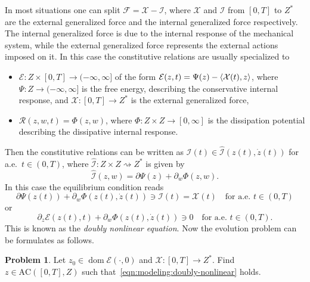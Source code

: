 \documentclass[a4paper,10pt,twoside]{amsbook}
\numberwithin{section}{chapter}
\numberwithin{equation}{chapter}
\theoremstyle{definition}
\newtheorem{prb}[prop]{Problem}
\DeclareMathOperator{\dom}{dom}
\DeclarePairedDelimiter{\dual}{\langle}{\rangle}
\begin{document}
In most situations one can split $\mathcal{F}=\mathcal{X}-\mathcal{I}$, where $\mathcal{X}$ and $\mathcal{I}$ from $[0,T]$ to $Z^*$ are the external generalized force and the internal generalized force respectively. The internal generalized force is due to the internal response of the mechanical system, while the external generalized force represents the external actions imposed on it. In this case the constitutive relations are usually specialized to
\begin{itemize}
\item[(i)] $\mathcal{E}\colon Z\times[0,T]\to(-\infty,\infty]$ of the form $\mathcal{E}(z,t)=\Psi(z)-\dual{\mathcal{X}(t),z}$, where $\Psi\colon Z\to(-\infty,\infty]$ is the free energy, describing the conservative internal response, and $\mathcal{X}\colon[0,T]\to Z^*$ is the external generalized force,
\item[(ii)] $\mathcal{R}(z,w,t)=\Phi(z,w)$, where $\Phi\colon Z\times Z\to[0,\infty]$ is the dissipation potential describing the dissipative internal response.
\end{itemize}
Then the constitutive relations can be written as $\mathcal{I}(t)\in\hat{\mathcal{I}}(z(t),\dot{z}(t))$ for a.e.\ $t\in(0,T)$, where $\hat{\mathcal{I}}\colon Z\times Z\rightsquigarrow Z^*$ is given by
\begin{equation}
\label{eqn:modeling:constitutive}
\hat{\mathcal{I}}(z,w)=\partial\Psi(z)+\partial_w\Phi(z,w).
\end{equation}
In this case the equilibrium condition reads
\begin{equation}
\label{eqn:modeling:doubly:nonlinear-neat}
\partial\Psi(z(t))+\partial_w\Phi(z(t),\dot z(t))\ni\mathcal{I}(t)=\mathcal{X}(t)\quad\text{for a.e.\ $t\in(0,T)$}
\end{equation}
or
\begin{equation}
\label{eqn:modeling:doubly-nonlinear}
\partial_z\mathcal{E}(z(t),t)+\partial_w\Phi(z(t),\dot z(t))\ni0\quad\text{for a.e.\ $t\in(0,T)$}.
\end{equation}
This is known as the \emph{doubly nonlinear equation}. Now the evolution problem can be formulates as follows.
\begin{prb}
\label{prb:modeling:doubly-nonlinear}
Let $z_0\in\dom\mathcal{E}(\cdot,0)$ and $\mathcal{X}\colon[0,T]\to Z^*$. Find $z\in\text{AC}([0,T],Z)$ such that~\eqref{eqn:modeling:doubly-nonlinear} holds.
\end{prb}
\end{document}
